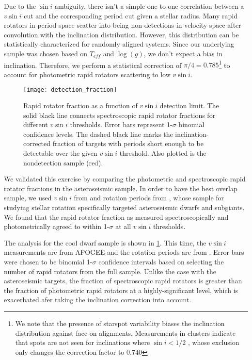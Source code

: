 \documentclass[manuscript]{aastex6}
\newcommand{\vsini}{\ensuremath{v \sin i}}
\newcommand{\Teff}{\ensuremath{T_{eff}}}
\newcommand{\logg}{\ensuremath{\log(g)}}
\begin{document}
Due to the \(\sin i\) ambiguity, there isn't a simple one-to-one correlation
between a \vsini{} cut and the corresponding period cut given a stellar radius.
Many rapid rotators in period-space scatter into being non-detections in
velocity space after convolution with the inclination distribution. However,
this distribution can be statistically characterized for randomly
aligned systems. Since our underlying sample was chosen based on
\Teff{} and \logg{}, we don't expect a bias in inclination.
Therefore, we perform a statistical correction of \(\pi/4=0.785\)\footnote{We 
  note that the presence of starspot variability biases the
    inclination distribution against face-on alignments. Measurements
    in clusters indicate that spots are not seen for inclinations where 
    \(\sin i < 1/2\) \citep{Jackson10}, whose exclusion only changes the 
correction factor to 0.740} 
to account for photometric rapid rotators scattering to low
\vsini{}. 

\begin{figure}[htb]
    \centering
    \texttt{[image: detection\_fraction]}
    \caption{Rapid rotator fraction as a function of \vsini{} detection limit.
    The solid black line connects spectroscopic rapid rotator fractions for 
    different \vsini{} thresholds. Error bars represent 1-\(\sigma\) binomial 
    confidence levels. The dashed black line marks the inclination-corrected 
    fraction of targets with \citet{McQuillan14} periods short enough to be 
    detectable over the given \vsini{} threshold. Also plotted is the 
\citet{McQuillan14} nondetection sample (red).\label{fig:detection_fraction}}
\end{figure}

We validated this exercise by comparing the photometric and spectroscopic
rapid rotator fractions in the asteroseismic sample. In order to have the best
overlap sample, we used \vsini{} from \citet{Bruntt12} and rotation periods
from \citet{Garcia14}, whose sample for studying stellar rotation specifically
targeted asteroseismic dwarfs and subgiants. We found that the rapid rotator
fraction as measured spectroscopically and photometrically agreed to within
1-\(\sigma\) at all \vsini{} thresholds. 

The analysis for the cool dwarf sample is shown in 
\cref{fig:detection_fraction}. This time, the \vsini{} measurements
are from APOGEE and the rotation periods are from \citet{McQuillan14}. Error
bars were chosen to be binomial 1-\(\sigma\) confidence intervals based on
selecting the number of rapid rotators from the full sample. Unlike  
the case with the asteroseismic targets, the fraction of spectroscopic rapid
rotators is greater than the fraction of photometric rapid
rotators at a highly-significant level, which is exacerbated afer taking the
inclination correction into account.
\end{document}

